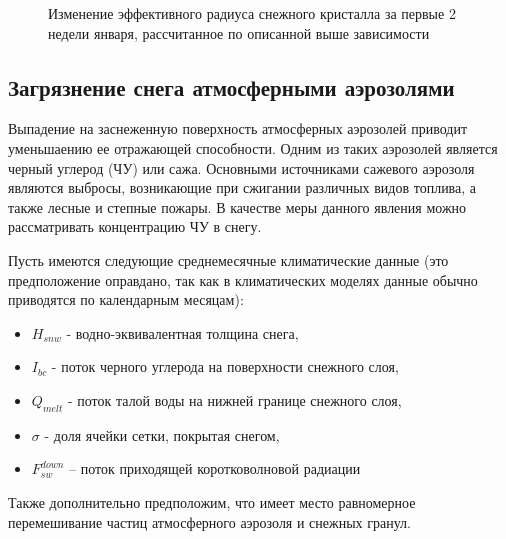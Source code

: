\documentclass[a4paper, fontsize=14pt]{scrartcl}
\begin{document}
\begin{figure}[h]
    \caption{Изменение эффективного радиуса снежного кристалла за первые 2 недели января, рассчитанное по описанной выше зависимости}
    \label{fig:image}
\end{figure}
 

\subsection{Загрязнение снега атмосферными аэрозолями}

Выпадение на заснеженную поверхность атмосферных аэрозолей приводит уменьшаению ее отражающей способности. Одним из таких аэрозолей является черный углерод (ЧУ) или сажа. Основными источниками сажевого аэрозоля являются выбросы, возникающие при сжигании различных видов топлива, а также лесные и степные пожары. В качестве меры данного явления можно рассматривать концентрацию ЧУ в снегу.

Пусть имеются следующие среднемесячные климатические данные (это предположение оправдано, так как в климатических моделях данные обычно приводятся по календарным месяцам):
\begin{itemize}
    \item $H_{snw}$ - водно-эквивалентная толщина снега, 
    \item $I_{bc}$ - поток черного углерода на поверхности снежного слоя, 
    \item $Q_{melt}$ - поток талой воды на нижней границе снежного слоя,
    \item $\sigma$ - доля ячейки сетки, покрытая снегом,
    \item $F_{sw}^{down}$ – поток приходящей коротковолновой радиации
\end{itemize} 
Также дополнительно предположим, что имеет место равномерное перемешивание частиц атмосферного аэрозоля и снежных гранул.
\end{document}
